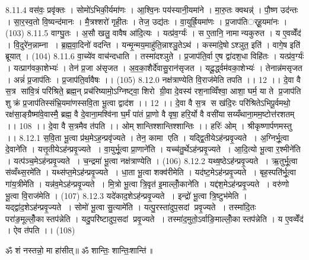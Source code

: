 8.11.4
वस॑वः॒ प्रवृ॑क्तः । सोमो॑ऽभिकी॒र्यमा॑णः । आ॒श्वि॒नः पय॑स्यानी॒यमा॑ने । मा॒रु॒तः क्वथन्न्॑ । पौ॒ष्ण उद॑न्तः । सा॒र॒स्व॒तो वि॒ष्यन्द॑मानः । मै॒त्रश्शरो॑ गृही॒तः । तेज॒ उद्य॑तः । वा॒युर्ह्रि॒यमा॑णः । प्र॒जाप॑तिर््हू॒यमा॑नः । (103)
8.11.5
वाग्घु॒तः । अ॒सौ खलु॒ वावैष आ॑दि॒त्यः । यत्प्र॑व॒र्ग्यः॑ । स ए॒तानि॒ नामान्यकुरुत । य ए॒वव्वेँद॑ । वि॒दुरे॑न॒न्नाम्ना । ब्र॒ह्म॒वा॒दिनो॑ वदन्ति । यन्मृ॒न्मय॒माहु॑ति॒न्नाश्ञु॒तेऽथ॑ । कस्मा॑दे॒षोऽश्ञुत॒ इति॑ । वागे॒ष इति॑ ब्रूयात् । (104)
8.11.6
वा॒च्ये॑व वाच॑न्दधाति । तस्मा॑दश्ञुते । प्र॒जाप॑ति॒र्वा ए॒ष द्वा॑दश॒धा विहि॑तः । यत्प्र॑व॒र्ग्यः॑ । यत्प्राग॑वका॒शेभ्यः॑ । तेन॑ प्र॒जा अ॑सृजत । अ॒व॒का॒शैर्दे॑वासु॒रान॑सृजत । यदू॒र्द्ध्वम॑वका॒शेभ्यः॑ । तेनान्न॑मसृजत । अन्नं॑ प्र॒जाप॑तिः । प्र॒जाप॑ति॒र्वावैषः ।। (105)
8.12.0
नक्ष॑त्राण्येति वि॒राज॑मेति तपति ।। 12 ।। दे॒वा वै स॒त्र सा॑वि॒त्रं परि॑श्रिते॒ ब्रह्म॒न् प्रच॑रिष्यामो॒ऽग्निष्ट्वा॒ शिरो ग्री॒वा दे॒वस्य॑ रश॒नाव्विँश्वा॒ आशा॒ घर्म॒ या ते प्र॒जाप॑ति शुक्रं प्र॒जाप॑तिस्संभ्रि॒यमा॑णस्सवि॒ता भू॒त्वा द्वाद॑श ।। 12 ।। दे॒वा वै स॒त्र स ख॑दि॒रः परि॑श्रितेऽभिपू॒र्वमथो॒ रक्ष॑सा॒ङ्ग्रैष्मा॑वे॒वास्मै॒ ब्रह्म॒ वै दे॒वाना॒मश्वि॑ना घ॒र्मं पा॑तं प्रा॒णो वै वृषा॒ हरि॒र्यो वै वसी॑यासय्यँथाना॒मम॒ष्टोत्त॑रशतम् ।। 108 ।। दे॒वा वै स॒त्रमैव त॑पति ।। ओम् शान्तिश्शान्तिश्शान्तिः ।। हरिः॑ ओम् । श्रीकृष्णार्पणमस्तु ।।
8.12.1
स॒वि॒ता भू॒त्वा प्र॑थ॒मेऽह॒न्प्रवृ॑ज्यते । तेन॒ कामा॑ एति । यद्द्वि॒तीयेऽह॑न्प्रवृ॒ज्यते । अ॒ग्निर्भू॒त्वा दे॒वाने॑ति । यत्तृ॒तीयेऽह॑न्प्रवृ॒ज्यते । वा॒युर्भू॒त्वा प्रा॒णाने॑ति । यच्च॑तु॒र्थेऽह॑न्प्रवृ॒ज्यते । आ॒दि॒त्यो भू॒त्वा र॒श्मीने॑ति । यत्प॑ञ्च॒मेऽह॑न्प्रवृ॒ज्यते । च॒न्द्रमा॑ भू॒त्वा नक्ष॑त्राण्येति । (106)
8.12.2
यथ्ष॒ष्ठेऽह॑न्प्रवृ॒ज्यते । ऋ॒तुर्भू॒त्वा स॑व्वँथ्स॒रमे॑ति । यथ्स॑प्त॒मेऽह॑न्प्रवृ॒ज्यते । धा॒ता भू॒त्वा शक्व॑रीमेति । यद॑ष्ट॒मेऽह॑न्प्रवृ॒ज्यते । बृह॒स्पति॑र्भू॒त्वा गा॑य॒त्रीमे॑ति । यन्न॑व॒मेऽह॑न्प्रवृ॒ज्यते । मि॒त्रो भू॒त्वा त्रि॒वृत॑ इ॒माल्लोँ॒काने॑ति । यद्द॑श॒मेऽह॑न्प्रवृ॒ज्यते । वरु॑णो भू॒त्वा वि॒राज॑मेति । (107)
8.12.3
यदे॑काद॒शेऽह॑न्प्रवृ॒ज्यते । इन्द्रो॑ भू॒त्वा त्रि॒ष्टुभ॑मेति । यद्द्वा॑द॒शेऽह॑न्प्रवृ॒ज्यते । सोमो॑ भू॒त्वा सु॒त्यामे॑ति । यत्पु॒रस्ता॑दुप॒सदां प्रवृ॒ज्यते । तस्मा॑दि॒तः परा॑ङ॒मूल्लोँ॒कास्तप॑न्नेति । यदु॒परि॑ष्टादुप॒सदां प्रवृ॒ज्यते । तस्मा॑द॒मुतो॒ऽर्वाङि॒माल्लोँ॒कास्तप॑न्नेति । य ए॒वव्वेँद॑ । ऐव त॑पति ।। (108)

ॐ शं नस्तन्नो॒ मा हा॑सीत्॥ ॐ शान्तिः॒ शान्तिः॒शान्ति॑॥



